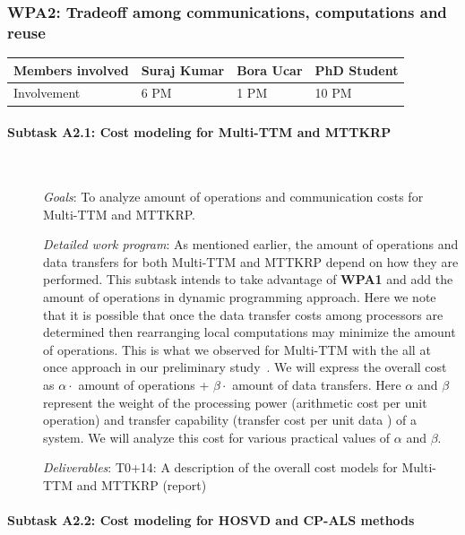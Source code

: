 \documentclass[a4paper,11pt]{article}
\newcommand{\subtask}[1]{{\color{orange}\paragraph{#1}$ $}}
\newcommand{\goal}{{\color{orange2}  \emph{Goals}:} }
\newcommand{\dwp}{{\color{orange2}  \emph{Detailed work program}: }}
\newcommand{\deliverables}{{\color{orange2}  \emph{Deliverables}: }}
\begin{document}
	\subsubsection{\textbf{WPA2}: Tradeoff among communications, computations and reuse}
	\begin{table}[H]
		\begin{tabular}{llll}
			\hline
			\cellcolor{blue2}
			Members involved & Suraj Kumar& Bora Ucar & PhD Student \\
			\hline
			\cellcolor{orange2}
			Involvement      & 6 PM            & 1 PM & 10 PM \\
			\hline
		\end{tabular}
	\end{table}
	\subtask{Subtask A2.1: Cost modeling for Multi-TTM and MTTKRP}
	\begin{description}
		\item[] \goal To analyze amount of operations and communication costs for Multi-TTM and MTTKRP. 
		\item[] \dwp As mentioned earlier, the amount of operations and data transfers for both Multi-TTM and MTTKRP depend on how they are performed. This subtask intends to take advantage of \textbf{WPA1} and add the amount of operations in dynamic programming approach. Here we note that it is possible that once the data transfer costs among processors are determined then rearranging local computations may minimize the amount of operations. This is what we observed for Multi-TTM with the all at once approach in our preliminary study~\cite{ABGKR-SIMAX-2024}. We will express the overall cost as $\alpha\cdot$ amount of operations + $\beta\cdot$ amount of data transfers. Here $\alpha$ and $\beta$ represent the weight of the processing power (arithmetic cost per unit operation) and transfer capability (transfer cost per unit data ) of a system. We will analyze this cost for various practical values of $\alpha$ and $\beta$.
		\item[] \deliverables\newline
		T0+14: A description of the overall cost models for Multi-TTM and MTTKRP (report)
	\end{description}
	\subtask{Subtask A2.2: Cost modeling for HOSVD and CP-ALS methods}
\end{document}
